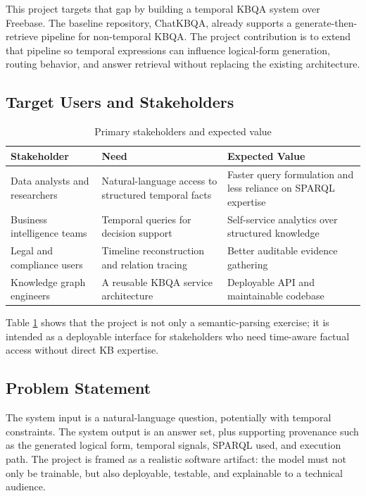 \documentclass[a4paper,11pt]{article}
\begin{document}
This project targets that gap by building a temporal KBQA system over Freebase. The baseline repository, ChatKBQA, already supports a generate-then-retrieve pipeline for non-temporal KBQA. The project contribution is to extend that pipeline so temporal expressions can influence logical-form generation, routing behavior, and answer retrieval without replacing the existing architecture.

\subsection{Target Users and Stakeholders}

\begin{table}[H]
\centering
\caption{Primary stakeholders and expected value}
\label{tab:stakeholders}
\begin{tabular}{p{4cm}p{4.8cm}p{5.2cm}}
\toprule
\textbf{Stakeholder} & \textbf{Need} & \textbf{Expected Value} \\
\midrule
Data analysts and researchers & Natural-language access to structured temporal facts & Faster query formulation and less reliance on SPARQL expertise \\
Business intelligence teams & Temporal queries for decision support & Self-service analytics over structured knowledge \\
Legal and compliance users & Timeline reconstruction and relation tracing & Better auditable evidence gathering \\
Knowledge graph engineers & A reusable KBQA service architecture & Deployable API and maintainable codebase \\
\bottomrule
\end{tabular}
\end{table}

Table \ref{tab:stakeholders} shows that the project is not only a semantic-parsing exercise; it is intended as a deployable interface for stakeholders who need time-aware factual access without direct KB expertise.

\subsection{Problem Statement}

The system input is a natural-language question, potentially with temporal constraints. The system output is an answer set, plus supporting provenance such as the generated logical form, temporal signals, SPARQL used, and execution path. The project is framed as a realistic software artifact: the model must not only be trainable, but also deployable, testable, and explainable to a technical audience.
\end{document}
